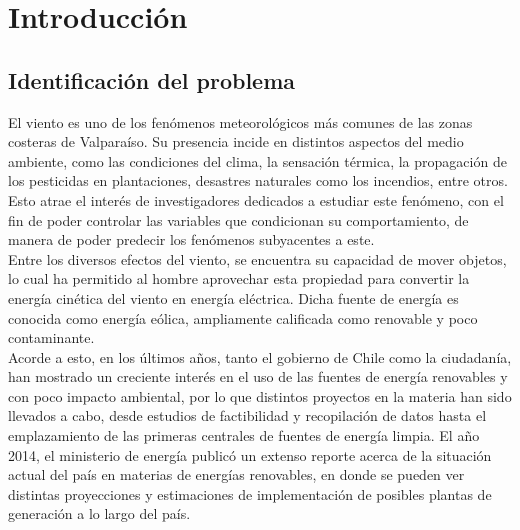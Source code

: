 
\chapter{Introducción}

\section{Identificación del problema}
El viento es uno de los fenómenos meteorológicos más comunes de las zonas costeras de Valparaíso. Su presencia incide en distintos aspectos del medio ambiente, como las condiciones del clima, la sensación térmica, la propagación de los pesticidas en plantaciones, desastres naturales como los incendios, entre otros. Esto atrae el interés de investigadores dedicados a estudiar este fenómeno, con el fin de poder controlar las variables que condicionan su comportamiento, de manera de poder predecir los fenómenos subyacentes a este.\\ 
Entre los diversos efectos del viento, se encuentra su capacidad de mover objetos, lo cual ha permitido al hombre aprovechar esta propiedad para convertir la energía cinética del viento en energía eléctrica. Dicha fuente de energía es conocida como energía eólica, ampliamente calificada como renovable y poco contaminante.\\
Acorde a esto, en los últimos años, tanto el gobierno de Chile como la ciudadanía, han mostrado un creciente interés en el uso de las fuentes de energía renovables y con poco impacto ambiental, por lo que distintos proyectos en la materia han sido llevados a cabo, desde estudios de factibilidad y recopilación de datos hasta el emplazamiento de las primeras centrales de fuentes de energía limpia. El año 2014, el ministerio de energía publicó un extenso reporte acerca de la situación actual del país en materias de energías renovables, en donde se pueden ver distintas proyecciones y estimaciones de implementación de posibles plantas de generación a lo largo del país. \cite{minenergia14}\\

